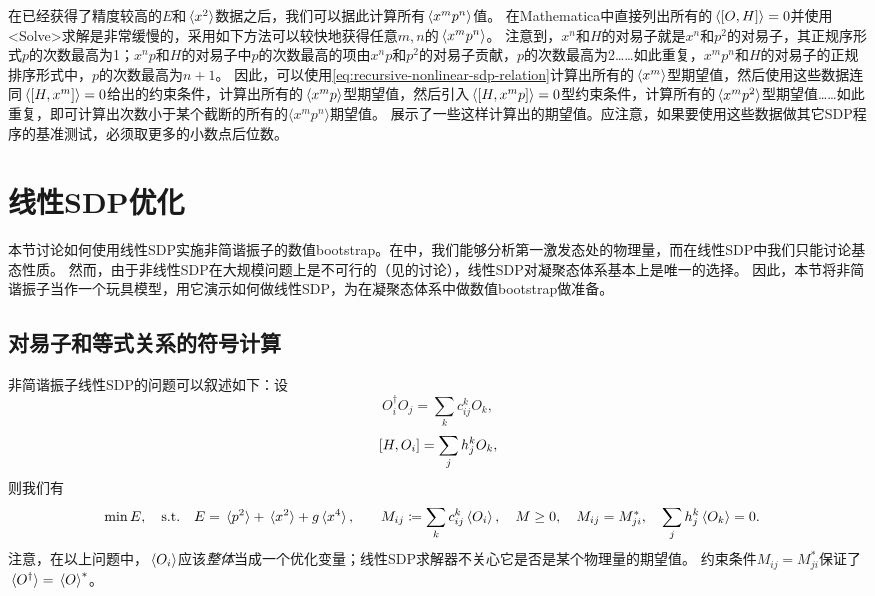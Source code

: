 \documentclass[oneside]{fduthesis}
\def\\{}%
\def\texttt#1{<#1>}%
\begin{document}
在已经获得了精度较高的$E$和$\expval*{x^2}$数据之后，我们可以据此计算所有$\expval*{x^m p^n}$值。
在Mathematica中直接列出所有的$\expval*{\comm{O}{H}} = 0$并使用\texttt{Solve}求解是非常缓慢的，采用如下方法可以较快地获得任意$m, n$的$\expval*{x^m p^n}$。
注意到，$x^n$和$H$的对易子就是$x^n$和$p^2$的对易子，其正规序形式$p$的次数最高为1；$x^n p$和$H$的对易子中$p$的次数最高的项由$x^n p$和$p^2$的对易子贡献，$p$的次数最高为2……如此重复，$x^m p^n$和$H$的对易子的正规排序形式中，$p$的次数最高为$n+1$。
因此，可以使用\eqref{eq:recursive-nonlinear-sdp-relation}计算出所有的$\expval*{x^m}$型期望值，然后使用这些数据连同$\expval*{\comm{H}{x^m}} = 0$给出的约束条件，计算出所有的$\expval*{x^m p}$型期望值，然后引入$\expval*{\comm{H}{x^m p}} = 0$型约束条件，计算所有的$\expval*{x^m p^2}$型期望值……如此重复，即可计算出次数小于某个截断的所有的$\langle x^m p^n \rangle$期望值。
展示了一些这样计算出的期望值。应注意，如果要使用这些数据做其它SDP程序的基准测试，必须取更多的小数点后位数。

\section{线性SDP优化}\label{sec:linear-sdp-oscillator}

本节讨论如何使用线性SDP实施非简谐振子的数值bootstrap。在中，我们能够分析第一激发态处的物理量，而在线性SDP中我们只能讨论基态性质。
然而，由于非线性SDP在大规模问题上是不可行的（见的讨论），线性SDP对凝聚态体系基本上是唯一的选择。
因此，本节将非简谐振子当作一个玩具模型，用它演示如何做线性SDP，为在凝聚态体系中做数值bootstrap做准备。

\subsection{对易子和等式关系的符号计算}

非简谐振子线性SDP的问题可以叙述如下：设
\begin{equation}
    O_i^\dagger O_j = \sum_{k} c_{ij}^k O_k,
\end{equation}
\begin{equation}
    \comm{H}{O_i} = \sum_j h_j^k O_k,
\end{equation}
则我们有
\begin{equation}
    \begin{aligned}
        &\min E, \quad \text{s.t.} \quad E = \expval*{p^2} + \expval*{x^2} + g \expval*{x^4}, \\
        &\quad M_{ij} \coloneqq \sum_k c^k_{ij} \expval*{O_i}, \quad M \geq 0, \quad M_{ij} = M_{ji}^* , \\
        &\quad \sum_j h_j^k \expval*{O_k} = 0.
    \end{aligned}
    \label{eq:oscillator-linear-sdp}
\end{equation}
注意，在以上问题中，$\expval*{O_i}$应该\emph{整体}当成一个优化变量；线性SDP求解器不关心它是否是某个物理量的期望值。
约束条件$M_{ij} = M_{ji}^*$保证了$\expval*{O^\dagger} = \expval*{O}^*$。
\end{document}
